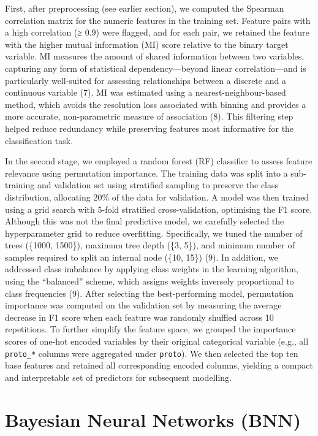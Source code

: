 \documentclass[
  a4paper,
]{scrreprt}
\begin{document}
First, after preprocessing (see earlier section), we computed the
Spearman correlation matrix for the numeric features in the training
set. Feature pairs with a high correlation (≥ 0.9) were flagged, and for
each pair, we retained the feature with the higher mutual information
(MI) score relative to the binary target variable. MI measures the
amount of shared information between two variables, capturing any form
of statistical dependency---beyond linear correlation---and is
particularly well-suited for assessing relationships between a discrete
and a continuous variable (7). MI was estimated using a
nearest-neighbour-based method, which avoids the resolution loss
associated with binning and provides a more accurate, non-parametric
measure of association (8). This filtering step helped reduce redundancy
while preserving features most informative for the classification task.

In the second stage, we employed a random forest (RF) classifier to
assess feature relevance using permutation importance. The training data
was split into a sub-training and validation set using stratified
sampling to preserve the class distribution, allocating 20\% of the data
for validation. A model was then trained using a grid search with 5-fold
stratified cross-validation, optimising the F1 score. Although this was
not the final predictive model, we carefully selected the hyperparameter
grid to reduce overfitting. Specifically, we tuned the number of trees
(\{1000, 1500\}), maximum tree depth (\{3, 5\}), and minimum number of
samples required to split an internal node (\{10, 15\}) (9). In
addition, we addressed class imbalance by applying class weights in the
learning algorithm, using the ``balanced'' scheme, which assigns weights
inversely proportional to class frequencies (9). After selecting the
best-performing model, permutation importance was computed on the
validation set by measuring the average decrease in F1 score when each
feature was randomly shuffled across 10 repetitions. To further simplify
the feature space, we grouped the importance scores of one-hot encoded
variables by their original categorical variable (e.g., all
\texttt{proto\_*} columns were aggregated under \texttt{proto}). We then
selected the top ten base features and retained all corresponding
encoded columns, yielding a compact and interpretable set of predictors
for subsequent modelling.

\section{Bayesian Neural Networks
(BNN)}\label{bayesian-neural-networks-bnn}
\end{document}
